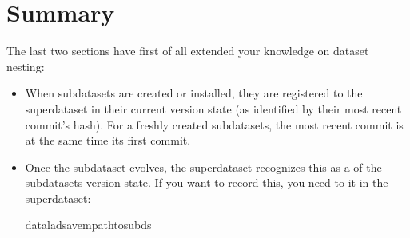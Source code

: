 \section{Summary}
\label{\detokenize{basics/101-134-summary:summary}}\label{\detokenize{basics/101-134-summary:summary-containers}}\label{\detokenize{basics/101-134-summary::doc}}
\sphinxAtStartPar
The last two sections have first of all extended your knowledge on dataset nesting:
\begin{itemize}
\item {} 
\sphinxAtStartPar
When subdatasets are created or installed, they are registered to the superdataset
in their current version state (as identified by their most recent commit’s hash).
For a freshly created subdatasets, the most recent commit is at the same time its
first commit.

\item {} 
\sphinxAtStartPar
Once the subdataset evolves, the superdataset recognizes this as a 
of the subdatasets version state. If you want to record this, you need to
 it in the superdataset:

\begin{sphinxVerbatim}[commandchars=\\\{\}]
dataladsave\PYGZhy{}m\PYGZlt{}pathtosubds\PYGZgt{}
\end{sphinxVerbatim}

\end{itemize}


